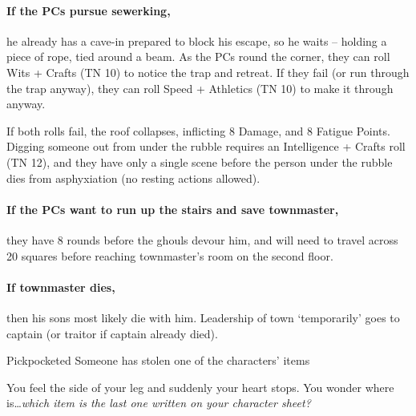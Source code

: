 \begin{multicols}{2}
\ghast

\ghast

\sewerking


\paragraph{If the PCs pursue \gls{sewerking},}
he already has a cave-in prepared to block his escape, so he waits -- holding a piece of rope, tied around a beam.
As the PCs round the corner, they can roll Wits + Crafts (TN 10) to notice the trap and retreat.
If they fail (or run through the trap anyway), they can roll Speed + Athletics (TN 10) to make it through anyway.

If both rolls fail, the roof collapses, inflicting 8 Damage, and 8 Fatigue Points.
Digging someone out from under the rubble requires an Intelligence + Crafts roll (TN 12), and they have only a single scene before the person under the rubble dies from asphyxiation (no resting actions allowed).

\paragraph{If the PCs want to run up the stairs and save \gls{townmaster},}
they have 8 rounds before the ghouls devour him, and will need to travel across 20 squares before reaching \gls{townmaster}'s room on the second floor.

\paragraph{If \gls{townmaster} dies,}
then his sons most likely die with him.
Leadership of \gls{town} `temporarily' goes to \Gls{captain} (or \gls{traitor} if \gls{captain} already died).

\stopcontents[sq]

\label{randommeetings}

\startcontents[sq]

\sqminitoc

{Pickpocketed}%
{Someone has stolen one of the characters' items}%

\begin{boxtext}

  You feel the side of your leg and suddenly your heart stops.
  You wonder where is\ldots \textit{which item is the last one written on your character sheet?}


\end{boxtext}
\end{multicols}
